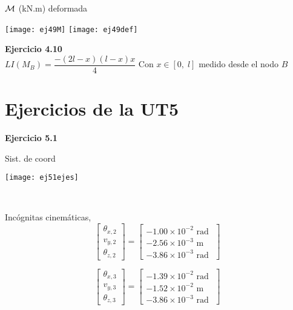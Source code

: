 ${\mathcal M}$ (kN.m) \hspace{0.4\textwidth} deformada
\begin{center}
	\texttt{[image: ej49M]}
	\texttt{[image: ej49def]}
\end{center}

\textbf{Ejercicio 4.10}\\

$LI(M_B)=\dfrac{-(2l-x)(l-x)x}{4}$
Con $x\in[0,\;l]$ medido desde el nodo $B$






\section{Ejercicios de la UT5}

\textbf{Ejercicio 5.1}\\

\begin{minipage}{0.45\textwidth}
	Sist. de coord
	
	\texttt{[image: ej51ejes]}
\end{minipage}
~
\begin{minipage}{0.45\textwidth}
Incógnitas cinemáticas,
$$
\left[
\begin{matrix}
\theta_{x,2} \\
v_{y,2} \\
\theta_{z,2}
\end{matrix}
\right]
=
\left[
\begin{matrix}
-1.00\times 10^{-2} \text{ rad }\\
-2.56\times 10^{-3} \text{ m }\\
-3.86\times 10^{-3} \text{ rad }
\end{matrix}
\right]
$$

$$
\left[
\begin{matrix}
\theta_{x,3} \\
v_{y,3} \\
\theta_{z,3}
\end{matrix}
\right]
=
\left[
\begin{matrix}
-1.39\times 10^{-2} \text{ rad }\\
-1.52\times 10^{-2} \text{ m }\\
-3.86\times 10^{-3} \text{ rad }
\end{matrix}
\right]
$$
\end{minipage}

